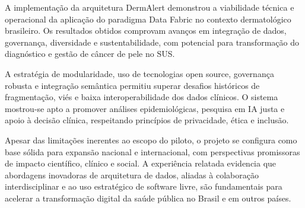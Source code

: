 A implementação da arquitetura DermAlert demonstrou a viabilidade técnica e operacional da aplicação do paradigma Data Fabric no contexto dermatológico brasileiro. Os resultados obtidos comprovam avanços em integração de dados, governança, diversidade e sustentabilidade, com potencial para transformação do diagnóstico e gestão de câncer de pele no SUS.

A estratégia de modularidade, uso de tecnologias open source, governança robusta e integração semântica permitiu superar desafios históricos de fragmentação, viés e baixa interoperabilidade dos dados clínicos. O sistema mostrou-se apto a promover análises epidemiológicas, pesquisa em IA justa e apoio à decisão clínica, respeitando princípios de privacidade, ética e inclusão.

Apesar das limitações inerentes ao escopo do piloto, o projeto se configura como base sólida para expansão nacional e internacional, com perspectivas promissoras de impacto científico, clínico e social. A experiência relatada evidencia que abordagens inovadoras de arquitetura de dados, aliadas à colaboração interdisciplinar e ao uso estratégico de software livre, são fundamentais para acelerar a transformação digital da saúde pública no Brasil e em outros países.
